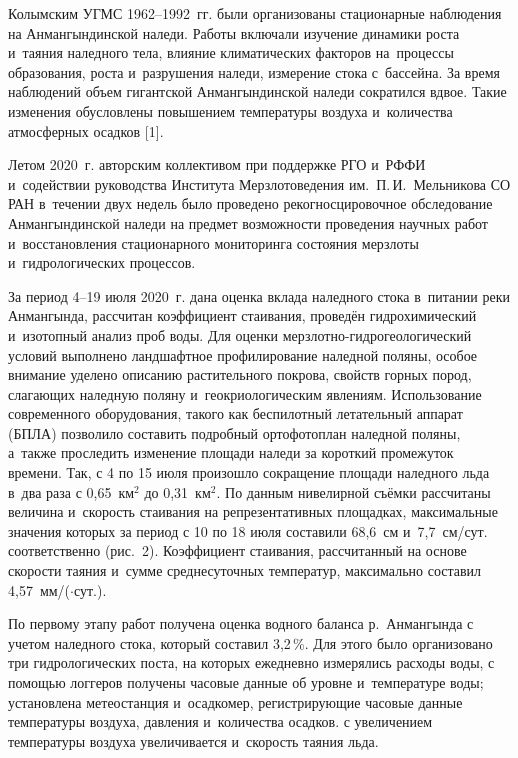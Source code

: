 Колымским УГМС 1962--1992~гг. были организованы стационарные наблюдения на Анмангындинской наледи. Работы включали изучение динамики роста и~таяния наледного тела, влияние климатических факторов на~процессы образования, роста и~разрушения наледи, измерение стока с~бассейна. За время наблюдений объем гигантской Анмангындинской наледи сократился вдвое. Такие изменения обусловлены повышением температуры воздуха и~количества атмосферных осадков [1].

Летом 2020~г. авторским коллективом при поддержке РГО и~РФФИ и~содействии руководства Института Мерзлотоведения им.~П.\,И.~Мельникова СО РАН в~течении двух недель было проведено рекогносцировочное обследование Анмангындинской наледи на предмет возможности проведения научных работ и~восстановления стационарного мониторинга состояния мерзлоты и~гидрологических процессов.

За период 4--19 июля 2020~г. дана оценка вклада наледного стока в~питании реки Анмангында, рассчитан коэффициент стаивания, проведён гидрохимический и~изотопный анализ проб воды. Для оценки мерзлотно-гидрогеологический условий выполнено ландшафтное профилирование наледной поляны, особое внимание уделено описанию растительного покрова, свойств горных пород, слагающих наледную поляну и~геокриологическим явлениям. Использование современного оборудования, такого как беспилотный летательный аппарат (БПЛА) позволило составить подробный ортофотоплан наледной поляны, а~также проследить изменение площади наледи за короткий промежуток времени. Так, с 4 по 15 июля произошло сокращение площади наледного льда в~два раза с 0,65~км$^2$ до 0,31~км$^2$. По данным нивелирной съёмки рассчитаны величина и~скорость стаивания на репрезентативных площадках, максимальные значения которых за период с 10 по 18 июля составили 68,6~см и~7,7~см/сут. соответственно (рис.~2). Коэффициент стаивания, рассчитанный на основе скорости таяния и~сумме среднесуточных температур, максимально составил 4,57~мм/($\cdot$сут.).



По первому этапу работ получена оценка водного баланса р.~Анмангында с учетом наледного стока, который составил 3,2\,\%. Для этого было организовано три гидрологических поста, на которых ежедневно измерялись расходы воды, с помощью логгеров получены часовые данные об уровне и~температуре воды; установлена метеостанция и~осадкомер, регистрирующие часовые данные температуры воздуха, давления и~количества осадков. с увеличением температуры воздуха увеличивается и~скорость таяния льда.

